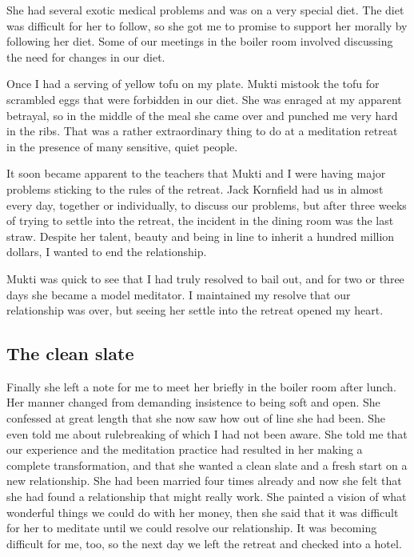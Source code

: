 \documentclass[a5paper,10pt,english]{book}
\begin{document}
\sphinxAtStartPar
She had several exotic medical problems and was on a very special diet.
The diet was difficult for her to follow, so she got me to promise to
support her morally by following her diet. Some of our meetings in the
boiler room involved discussing the need for changes in our diet.

\sphinxAtStartPar
Once I had a serving of yellow tofu on my plate. Mukti mistook the tofu
for scrambled eggs that were forbidden in our diet. She was enraged at
my apparent betrayal, so in the middle of the meal she came over and
punched me very hard in the ribs. That was a rather extraordinary thing
to do at a meditation retreat in the presence of many sensitive, quiet
people.

\sphinxAtStartPar
It soon became apparent to the teachers that Mukti and I were having
major problems sticking to the rules of the retreat. Jack Kornfield had
us in almost every day, together or individually, to discuss our
problems, but after three weeks of trying to settle into the retreat,
the incident in the dining room was the last straw. Despite her talent,
beauty and being in line to inherit a hundred million dollars, I wanted
to end the relationship.

\sphinxAtStartPar
Mukti was quick to see that I had truly resolved to bail out, and for
two or three days she became a model meditator. I maintained my resolve
that our relationship was over, but seeing her settle into the retreat
opened my heart.


\subsection{The clean slate}
\label{\detokenize{psychopaths:the-clean-slate}}
\sphinxAtStartPar
Finally she left a note for me to meet her briefly in the boiler room
after lunch. Her manner changed from demanding insistence to being soft
and open. She confessed at great length that she now saw how out of line
she had been. She even told me about rule\sphinxhyphen{}breaking of which I had not
been aware. She told me that our experience and the meditation practice
had resulted in her making a complete transformation, and that she
wanted a clean slate and a fresh start on a new relationship. She had
been married four times already and now she felt that she had found a
relationship that might really work. She painted a vision of what
wonderful things we could do with her money, then she said that it was
difficult for her to meditate until we could resolve our relationship.
It was becoming difficult for me, too, so the next day we left the
retreat and checked into a hotel.
\end{document}

